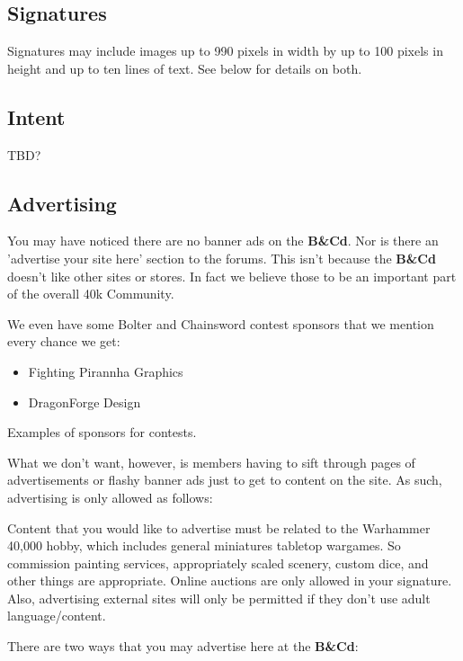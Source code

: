 \documentclass[12pt]{article}
\newcommand{\BnC}{{\textbf{B\&Cd}}}%
\begin{document}
\subsection{Signatures}

Signatures may include images up to 990 pixels in width by up to 100 
pixels in height and up to ten lines of text. See below for details on 
both.

\subsection{Intent}

TBD?

\subsection{Advertising}

You may have noticed there are no banner ads on the {\BnC}. Nor is there 
an 'advertise your site here' section to the forums. This isn't because 
the {\BnC} doesn't like other sites or stores. In fact we believe those to 
be an important part of the overall 40k Community.

We even have some Bolter and Chainsword contest sponsors that we 
mention every chance we get:

\begin{table}[H]
\begin{itemize}
\item Fighting Pirannha Graphics
\item DragonForge Design
\end{itemize}
	\caption{Examples of sponsors for contests.}
\end{table}

What we don't want, however, is members having to sift through pages of 
advertisements or flashy banner ads just to get to content on the site. 
As such, advertising is only allowed as follows:

Content that you would like to advertise must be related to the 
Warhammer 40,000 hobby, which includes general miniatures tabletop 
wargames. So commission painting services, appropriately scaled 
scenery, custom dice, and other things are appropriate. Online auctions 
are only allowed in your signature. Also, advertising external sites 
will only be permitted if they don't use adult language/content.

There are two ways that you may advertise here at the {\BnC}:
\end{document}
